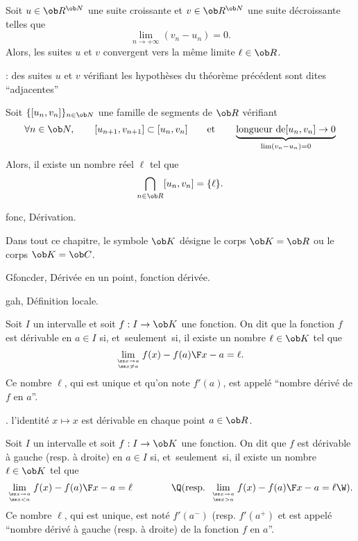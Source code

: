 \Theoreme [Title=Théorème des suites adjacentes]
Soit $u\in\ob R^{\ob N}$ une suite croissante et $v\in\ob R^{\ob N}$ une suite décroissante telles que 
$$
\lim_{n\to+\infty}(v_n-u_n)=0.
$$
Alors, les suites $u$ et $v$ convergent vers la même limite $\ell\in\ob R$. 

\Remarque : des suites $u$ et $v$ vérifiant les hypothèses du théorème précédent sont dites ``adjacentes'' 
\bigskip

\Theoreme [Title=Théorème des segments emboités] Soit $\{[u_n,v_n]\}_{n\in\ob N}$ une famille de segments de $\ob R$ vérifiant 
$$
\forall n\in\ob N,\qquad [u_{n+1},v_{n+1}]\subset[u_n,v_n]\qquad \mbox{et}\qquad \underbrace{\mbox{longueur de}[u_n,v_n]\to0}_{\lim(v_n-u_n)=0}
$$
Alors, il existe un nombre réel $\ell$ tel que 
$$
\bigcap_{n\in\ob R}[u_n,v_n]=\{\ell\}.
$$









\pagetitretrue


\Chapter fonc, Dérivation. 
\bigskip

\noindent
Dans tout ce chapitre, le symbole $\ob K$ désigne le corps $\ob K=\ob R$ ou le corps $\ob K=\ob C$. 
\bigskip

\Section Gfoncder, Dérivée en un point, fonction dérivée. 

\Subsection gah, Définition locale. 

\Definition []  Soit $I$ un intervalle et soit $f:I\to\ob K$ une fonction. On dit que la fonction $f$ est dérivable en $a\in I$ si, et~seulement~si, il existe un nombre $\ell\in\ob K$ tel que 
$$
\lim_{\ss x\to a\atop\ss x\neq a}{f(x)-f(a)\F x-a}=\ell. 
$$
Ce nombre $\ell$, qui est unique et qu'on note $f'(a)$, est appelé ``nombre dérivé de $f$ en $a$''. 
\bigskip

\Exemple. l'identité $x\mapsto x$ est dérivable en chaque point $a\in\ob R$. 

\Definition []  Soit $I$ un intervalle et soit $f:I\to\ob K$ une fonction. On dit que $f$ est dérivable à gauche (resp. à droite) 
en $a\in I$ si, et~seulement~si, il existe un nombre $\ell\in\ob K$ tel que 
$$
\lim_{\ss x\to a\atop\ss x<a}{f(x)-f(a)\F x-a}=\ell\qquad\qquad\Q(\mbox{resp. }\lim_{\ss x\to a\atop\ss x>a}{f(x)-f(a)\F x-a}=\ell\W). 
$$
Ce nombre $\ell$, qui est unique, est noté $f'(a^-)$ (resp. $f'(a^+)$ et est appelé ``nombre dérivé à gauche (resp. à droite) 
de la fonction $f$ en $a$''. 
\bigskip

